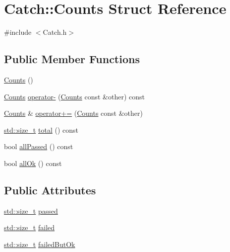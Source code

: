 \hypertarget{struct_catch_1_1_counts}{}\section{Catch\+:\+:Counts Struct Reference}
\label{struct_catch_1_1_counts}


{\ttfamily \#include $<$Catch.\+h$>$}

\subsection*{Public Member Functions}
\begin{DoxyCompactItemize}
\item 
\hyperlink{struct_catch_1_1_counts_aab9092ce70d4b0179cc743555d2fc39b}{Counts} ()
\item 
\hyperlink{struct_catch_1_1_counts}{Counts} \hyperlink{struct_catch_1_1_counts_aedf86fefe33938d132a6981171cd83e6}{operator-\/} (\hyperlink{struct_catch_1_1_counts}{Counts} const \&other) const 
\item 
\hyperlink{struct_catch_1_1_counts}{Counts} \& \hyperlink{struct_catch_1_1_counts_a322a89475cd2cc039140ef371e973677}{operator+=} (\hyperlink{struct_catch_1_1_counts}{Counts} const \&other)
\item 
\hyperlink{_s_d_l__config_8h_a7c94ea6f8948649f8d181ae55911eeaf}{std\+::size\+\_\+t} \hyperlink{struct_catch_1_1_counts_a9125c662e30114e5c5cc94729b1e9e84}{total} () const 
\item 
bool \hyperlink{struct_catch_1_1_counts_adbbaca552f6017ce69e0d5dc5500bea4}{all\+Passed} () const 
\item 
bool \hyperlink{struct_catch_1_1_counts_ab2497c9dfc77be757a90225ea69595f5}{all\+Ok} () const 
\end{DoxyCompactItemize}
\subsection*{Public Attributes}
\begin{DoxyCompactItemize}
\item 
\hyperlink{_s_d_l__config_8h_a7c94ea6f8948649f8d181ae55911eeaf}{std\+::size\+\_\+t} \hyperlink{struct_catch_1_1_counts_ad28daaf3de28006400208b6dd0c631e6}{passed}
\item 
\hyperlink{_s_d_l__config_8h_a7c94ea6f8948649f8d181ae55911eeaf}{std\+::size\+\_\+t} \hyperlink{struct_catch_1_1_counts_a19982a3817a3bc2c07f0290e71f497a3}{failed}
\item 
\hyperlink{_s_d_l__config_8h_a7c94ea6f8948649f8d181ae55911eeaf}{std\+::size\+\_\+t} \hyperlink{struct_catch_1_1_counts_ac090973a2ff51394cd452718e75c073e}{failed\+But\+Ok}
\end{DoxyCompactItemize}


